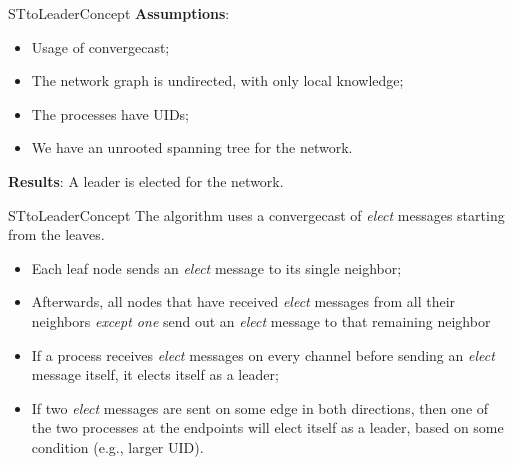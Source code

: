 \documentclass[pdf]{beamer}
\begin{document}
\begin{frame}{STtoLeader}{Concept}
    \textbf{Assumptions}:
    \begin{itemize}
        \item Usage of convergecast; \\
        \item The network graph is undirected, with only local knowledge; \\
        \item The processes have UIDs; \\
        \item We have an unrooted spanning tree for the network.
    \end{itemize}
   
    \vspace{12pt}
    \textbf{Results}:
    A leader is elected for the network.
\end{frame}

\begin{frame}{STtoLeader}{Concept}
    The algorithm uses a convergecast of \emph{elect} messages starting from the leaves.\\
    \begin{itemize}
        \item Each leaf node sends an \emph{elect} message to its single neighbor; \\
        \item Afterwards, all nodes that have received \emph{elect} messages from all their neighbors \emph{except one} send out an \emph{elect} message to that remaining neighbor
        \item If a process receives \emph{elect} messages on every channel before
            sending an \emph{elect} message itself, it elects itself as a leader; \\
        \item If two \emph{elect} messages are sent on some edge in both directions, then
            one of the two processes at the endpoints will elect itself as a leader, based 
            on some condition (e.g., larger UID). 
    \end{itemize}
\end{frame}
\end{document}
